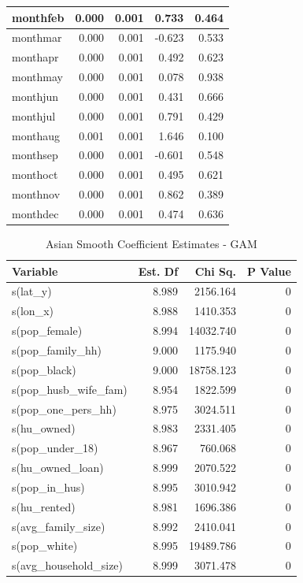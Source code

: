 \documentclass{ucetd}
\begin{document}
\begin{table}
\begin{tabular}[t]{l|r|r|r|r}
\hline
monthfeb & 0.000 & 0.001 & 0.733 & 0.464\\
\hline
monthmar & 0.000 & 0.001 & -0.623 & 0.533\\
\hline
monthapr & 0.000 & 0.001 & 0.492 & 0.623\\
\hline
monthmay & 0.000 & 0.001 & 0.078 & 0.938\\
\hline
monthjun & 0.000 & 0.001 & 0.431 & 0.666\\
\hline
monthjul & 0.000 & 0.001 & 0.791 & 0.429\\
\hline
monthaug & 0.001 & 0.001 & 1.646 & 0.100\\
\hline
monthsep & 0.000 & 0.001 & -0.601 & 0.548\\
\hline
monthoct & 0.000 & 0.001 & 0.495 & 0.621\\
\hline
monthnov & 0.000 & 0.001 & 0.862 & 0.389\\
\hline
monthdec & 0.000 & 0.001 & 0.474 & 0.636\\
\hline
\end{tabular}
\end{table}

\begin{table}

\caption{\label{tab:asian-gam}Asian Smooth Coefficient Estimates - GAM}
\centering
\begin{tabular}[t]{l|r|r|r}
\hline
Variable & Est. Df & Chi Sq. & P Value\\
\hline
s(lat\_y) & 8.989 & 2156.164 & 0\\
\hline
s(lon\_x) & 8.988 & 1410.353 & 0\\
\hline
s(pop\_female) & 8.994 & 14032.740 & 0\\
\hline
s(pop\_family\_hh) & 9.000 & 1175.940 & 0\\
\hline
s(pop\_black) & 9.000 & 18758.123 & 0\\
\hline
s(pop\_husb\_wife\_fam) & 8.954 & 1822.599 & 0\\
\hline
s(pop\_one\_pers\_hh) & 8.975 & 3024.511 & 0\\
\hline
s(hu\_owned) & 8.983 & 2331.405 & 0\\
\hline
s(pop\_under\_18) & 8.967 & 760.068 & 0\\
\hline
s(hu\_owned\_loan) & 8.999 & 2070.522 & 0\\
\hline
s(pop\_in\_hus) & 8.995 & 3010.942 & 0\\
\hline
s(hu\_rented) & 8.981 & 1696.386 & 0\\
\hline
s(avg\_family\_size) & 8.992 & 2410.041 & 0\\
\hline
s(pop\_white) & 8.995 & 19489.786 & 0\\
\hline
s(avg\_household\_size) & 8.999 & 3071.478 & 0\\
\hline
\end{tabular}
\end{table}
\end{document}
